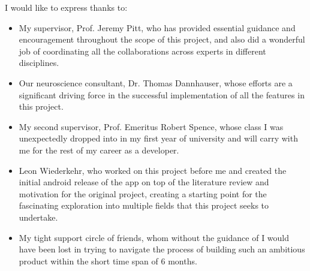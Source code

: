 \cleardoublepage

\begin{acknowledgements}

I would like to express thanks to:

\begin{itemize}
 \item My supervisor, Prof. Jeremy Pitt, who has provided essential guidance and encouragement throughout the scope of this project, and also did a wonderful job of coordinating all the collaborations across experts in different disciplines.
 \vspace*{3mm}
 \item Our neuroscience consultant, Dr. Thomas Dannhauser, whose efforts are a significant driving force in the successful implementation of all the features in this project.
 \item My second supervisor, Prof. Emeritus Robert Spence, whose class I was unexpectedly dropped into in my first year of university and will carry with me for the rest of my career as a developer.
 \vspace*{3mm}
 \item Leon Wiederkehr, who worked on this project before me and created the initial android release of the app on top of the literature review and motivation for the original project, creating a starting point for the fascinating exploration into multiple fields that this project seeks to undertake.
 \vspace*{3mm}
 \item My tight support circle of friends, whom without the guidance of I would have been lost in trying to navigate the process of building such an ambitious product within the short time span of 6 months.
\end{itemize}

\end{acknowledgements}